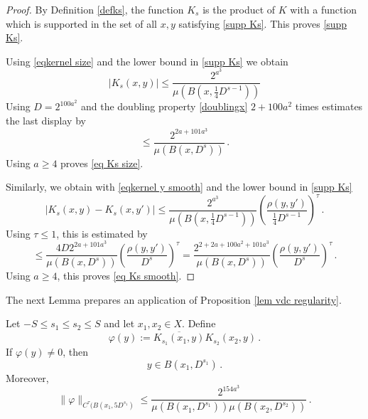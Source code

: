 \begin{proof}
By Definition \eqref{defks}, the function $K_s$ is the product of
$K$ with a function which is supported in the set of all
$x,y$ satisfying \eqref{supp Ks}. This proves \eqref{supp Ks}.

Using \eqref{eqkernel size} and the lower bound in \eqref{supp Ks}
we obtain
\begin{equation}
|K_s(x,y)|\le \frac{2^{a^3}}{\mu(B(x,\frac 14 D^{s-1}))}
\end{equation}
Using $D=2^{100a^2}$
and the doubling property \eqref{doublingx} $2 +100a^2$ times estimates
the last display by
\begin{equation}
\le \frac{2^{2a+101a^3}}{\mu(B(x,  D^{s}))}\, .
\end{equation}
Using $a\ge 4$ proves \eqref{eq Ks size}.


Similarly, we obtain with  \eqref{eqkernel y smooth} and the lower bound in
\eqref{supp Ks}
\begin{equation}
    |K_s(x,y)-K_s(x, y')|\le \frac{2^{a^3}}{\mu(B(x, \frac 14 D^{s-1}))}
    \left(\frac{ \rho(y,y')}{\frac 14 D^{s-1}}\right)^{\tau}\,.
\end{equation}
Using $\tau\le 1$, this is estimated by
\begin{equation}
    \le \frac{4D 2^{2a+101a^3}}{\mu(B(x,  D^{s}))}
    \left(\frac{ \rho(y,y')}{D^{s}}\right)^{\tau}
        = \frac{2^{2+2a+100a^2+101a^3}}{\mu(B(x,  D^{s}))}
    \left(\frac{ \rho(y,y')}{D^{s}}\right)^{\tau}\,.
\end{equation}
Using $a\ge 4$, this proves  \eqref{eq Ks smooth}.
\end{proof}
The next Lemma prepares an application of
Proposition \ref{lem vdc regularity}.
\begin{lemma}\label{lem ksquare}
Let $-S\le s_1\le s_2\le S$ and let $x_1,x_2\in X$.
Define \begin{equation}
    \varphi(y) :=  \overline{K_{s_1}(x_1, y)}
    K_{s_2}(x_2, y) \, .
\end{equation}
If $\varphi(y)\neq 0$, then
\begin{equation}\label{eqt10}
    y\in B(x_1, D^{s_1})\, .
\end{equation}
Moreover,
\begin{equation}\label{eqt11}
    \|\varphi\|_{C^\tau(B(x_1, 5D^{s_1})}\le
\frac{2^{154 a^3}}{\mu(B(x_1, D^{s_1}))\mu(B(x_2, D^{s_2}))}
        \, .
\end{equation}

\end{lemma}
